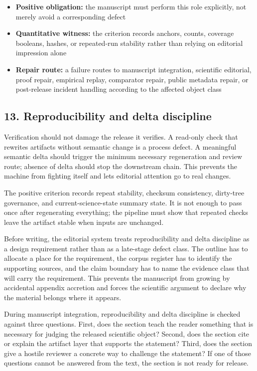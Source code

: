 \begin{itemize}[leftmargin=1.8em]

\item \textbf{Positive obligation:} the manuscript must perform this role explicitly, not merely avoid a corresponding defect

\item \textbf{Quantitative witness:} the criterion records anchors, counts, coverage booleans, hashes, or repeated-run stability rather than relying on editorial impression alone

\item \textbf{Repair route:} a failure routes to manuscript integration, scientific editorial, proof repair, empirical replay, comparator repair, public metadata repair, or post-release incident handling according to the affected object class

\end{itemize}

\subsection{13. Reproducibility and delta discipline}

Verification should not damage the release it verifies. A read-only check that rewrites artifacts without semantic change is a process defect. A meaningful semantic delta should trigger the minimum necessary regeneration and review route; absence of delta should stop the downstream chain. This prevents the machine from fighting itself and lets editorial attention go to real changes.


The positive criterion records repeat stability, checksum consistency, dirty-tree governance, and current-science-state summary state. It is not enough to pass once after regenerating everything; the pipeline must show that repeated checks leave the artifact stable when inputs are unchanged.


Before writing, the editorial system treats reproducibility and delta discipline as a design requirement rather than as a late-stage defect class. The outline has to allocate a place for the requirement, the corpus register has to identify the supporting sources, and the claim boundary has to name the evidence class that will carry the requirement. This prevents the manuscript from growing by accidental appendix accretion and forces the scientific argument to declare why the material belongs where it appears.


During manuscript integration, reproducibility and delta discipline is checked against three questions. First, does the section teach the reader something that is necessary for judging the released scientific object? Second, does the section cite or explain the artifact layer that supports the statement? Third, does the section give a hostile reviewer a concrete way to challenge the statement? If one of those questions cannot be answered from the text, the section is not ready for release.


